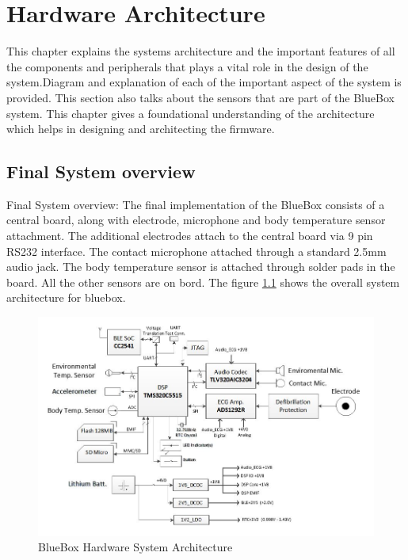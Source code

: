 \chapter{Hardware Architecture}
\hspace{10mm}This chapter explains the systems architecture and the important features of all the components and peripherals that plays a vital role in the design of the system.Diagram and explanation of each of the  important aspect of the system is provided. This section also talks about the sensors that are part of the BlueBox system. This chapter gives a foundational understanding of the architecture which helps in designing and architecting the firmware.

\section{Final System overview}
\hspace{10mm}Final System overview: 
The final implementation of the BlueBox consists of a central board, along with electrode, microphone and body temperature sensor attachment. The additional electrodes attach to the central board via 9 pin RS232 interface. The contact microphone attached through a standard 2.5mm audio jack. The body temperature sensor is attached through solder pads in the board. All the other sensors are on bord. 
The figure \ref{BlueBox_Architecture} shows the overall system architecture for bluebox.
\begin{figure}[h]
	\centering
	\includegraphics[scale = 0.75 ]{BlueBox_Architecture.JPG}
	\caption{BlueBox Hardware System Architecture\label{BlueBox_Architecture}}
\end{figure} 


